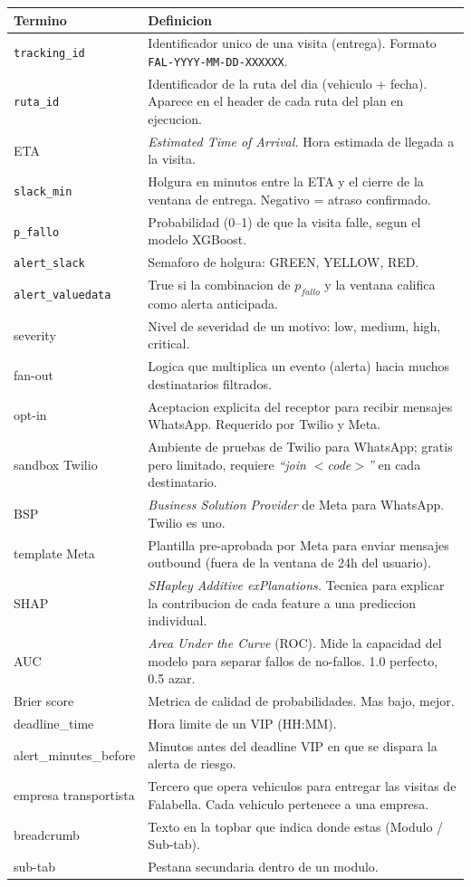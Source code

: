 \documentclass[11pt,a4paper]{article}
\begin{document}
\begin{longtable}{p{3.6cm} p{12.0cm}}
\toprule
\textbf{Termino} & \textbf{Definicion} \\
\midrule
\endhead
\texttt{tracking\_id} & Identificador unico de una visita (entrega).
  Formato \texttt{FAL-YYYY-MM-DD-XXXXXX}. \\
\texttt{ruta\_id} & Identificador de la ruta del dia
  (vehiculo + fecha). Aparece en el header de cada ruta del plan en
  ejecucion. \\
ETA & \emph{Estimated Time of Arrival.} Hora estimada de llegada a la
  visita. \\
\texttt{slack\_min} & Holgura en minutos entre la ETA y el cierre de
  la ventana de entrega. Negativo = atraso confirmado. \\
\texttt{p\_fallo} & Probabilidad (0--1) de que la visita falle, segun
  el modelo XGBoost. \\
\texttt{alert\_slack} & Semaforo de holgura: GREEN, YELLOW, RED. \\
\texttt{alert\_valuedata} & True si la combinacion de
  $p_{fallo}$ y la ventana califica como alerta anticipada. \\
severity & Nivel de severidad de un motivo: low, medium, high, critical. \\
fan-out & Logica que multiplica un evento (alerta) hacia muchos
  destinatarios filtrados. \\
opt-in & Aceptacion explicita del receptor para recibir mensajes
  WhatsApp. Requerido por Twilio y Meta. \\
sandbox Twilio & Ambiente de pruebas de Twilio para WhatsApp; gratis
  pero limitado, requiere \emph{``join $<$code$>$''} en cada destinatario. \\
BSP & \emph{Business Solution Provider} de Meta para WhatsApp. Twilio
  es uno. \\
template Meta & Plantilla pre-aprobada por Meta para enviar mensajes
  outbound (fuera de la ventana de 24h del usuario). \\
SHAP & \emph{SHapley Additive exPlanations.} Tecnica para explicar la
  contribucion de cada feature a una prediccion individual. \\
AUC & \emph{Area Under the Curve} (ROC). Mide la capacidad del modelo
  para separar fallos de no-fallos. 1.0 perfecto, 0.5 azar. \\
Brier score & Metrica de calidad de probabilidades. Mas bajo, mejor. \\
deadline\_time & Hora limite de un VIP (HH:MM). \\
alert\_minutes\_before & Minutos antes del deadline VIP en que se
  dispara la alerta de riesgo. \\
empresa transportista & Tercero que opera vehiculos para entregar las
  visitas de Falabella. Cada vehiculo pertenece a una empresa. \\
breadcrumb & Texto en la topbar que indica donde estas (Modulo /
  Sub-tab). \\
sub-tab & Pestana secundaria dentro de un modulo. \\
\bottomrule
\end{longtable}
\end{document}
